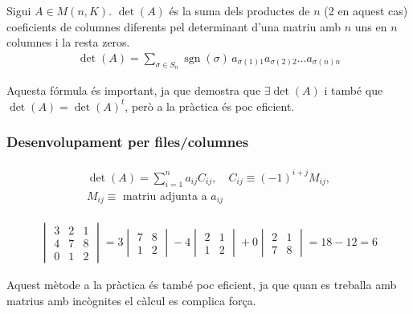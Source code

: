 Sigui $A \in M(n,K)$. $\det (A)$ és la suma dels productes de $n$ (2 en aquest cas) coeficients de columnes diferents pel determinant d'una matriu amb $n$ uns en $n$ columnes i la resta zeros.
\begin{align}
    \det (A) = \sum\limits_{\sigma \in S_{n}} \operatorname{sgn} (\sigma) \, a_{\sigma (1) 1} a_{\sigma (2) 2} \dots a_{\sigma (n) n}
\end{align}

Aquesta fórmula és important, ja que demostra que $\exists \det (A)$ i també que $\det (A) = \det (A)^{t}$, però a la pràctica és poc eficient.

\subsubsection*{Desenvolupament per files/columnes}
\begin{align}
\begin{gathered}
    \det (A) = \sum\limits_{i=1}^n a_{ij} C_{ij}, \quad C_{ij} \equiv (-1)^{i+j} M_{ij}, \\ M_{ij}\equiv \text{ matriu adjunta a } a_{ij}
\end{gathered}
\end{align}
\begin{example}
\begin{align*}
    \begin{vmatrix} 3 & 2 & 1 \\ 4 & 7 & 8 \\ 0 & 1 & 2 \end{vmatrix} = 3 \begin{vmatrix} 7 & 8 \\ 1 & 2 \end{vmatrix} - 4 \begin{vmatrix} 2 & 1 \\ 1 & 2 \end{vmatrix} + 0 \begin{vmatrix} 2 & 1 \\ 7 & 8 \end{vmatrix} = 18 - 12 = 6
\end{align*}
\end{example}

Aquest mètode a la pràctica és també poc eficient, ja que quan es treballa amb matrius amb incògnites el càlcul es complica força.

